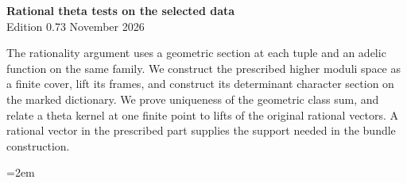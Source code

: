 \begin{center}
{\Large\bfseries Rational theta tests on the selected data}\\[4pt]
Edition 0.73  November 2026
\end{center}

The rationality argument uses a geometric section at each tuple and an
adelic function on the same family. We construct the prescribed higher moduli
space as a finite cover, lift its frames, and construct its determinant
character section on the marked dictionary. We prove uniqueness of the geometric class sum, and relate
a theta kernel at one finite point to lifts of the original rational
vectors. A rational vector in the prescribed part supplies the support
needed in the bundle construction.

\begingroup\emergencystretch=2em






\endgroup
